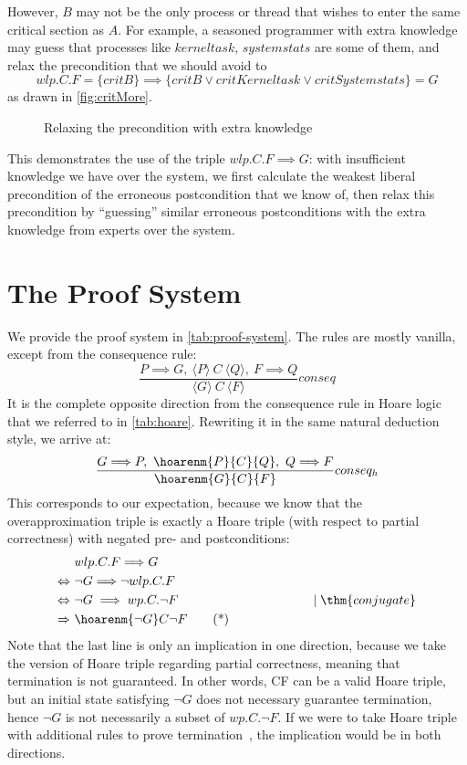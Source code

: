 However, $B$ may not be the only process or thread that wishes to enter the same critical section as $A$. 
For example, a seasoned programmer with extra knowledge may guess that processes like $kerneltask$, $systemstats$ are some of them, and relax the precondition that we should avoid to 
$$wlp.C.F = \{critB\}\implies \{critB \vee critKerneltask \vee critSystemstats\} = G$$
as drawn in \autoref{fig:critMore}. 
\begin{figure}[ht]
	\centering
	
	\caption{Relaxing the precondition with extra knowledge}
	\label{fig:critMore}
\end{figure}
This demonstrates the use of the triple $wlp.C.F{\implies} G$: with insufficient knowledge we have over the system, we first calculate the weakest liberal precondition of the erroneous postcondition that we know of, then relax this precondition by ``guessing'' similar erroneous postconditions with the extra knowledge from experts over the system. 

\section{The Proof System}
\newcommand{\nlp}[3]{\langle #1 \rangle\ #2\ \langle #3 \rangle}

We provide the proof system in \autoref{tab:proof-system}. 
The rules are mostly vanilla, except from the consequence rule: 
$$\displaystyle\frac{P{\implies} G,\ \nlp P C Q,\ F{\implies} Q}{\nlp{G}{C}{F}} conseq$$
It is the complete opposite direction from the consequence rule in Hoare logic that we referred to in \autoref{tab:hoare}. 
Rewriting it in the same natural deduction style, we arrive at: 
$$\displaystyle\frac{G{\implies} P,\ \hoarenm{P}{C}{Q},\ Q{\implies} F}{\hoarenm{G}{C}{F}}conseq_h$$
This corresponds to our expectation, because we know that the overapproximation triple is exactly a Hoare triple (with respect to partial correctness) with negated pre- and postconditions:
\begin{align*}
	& \ wlp.C.F{\implies} G \\
	\Leftrightarrow &\  \neg G {\implies} \neg wlp.C.F \\
	\Leftrightarrow &\  \neg G \implies wp.C.\neg F 
		\hspace{0.3\textwidth} \mid {\thm{conjugate}} \\
	\Rightarrow &\  \hoarenm{\neg G}C{\neg F} 
	\tag{*} 
\end{align*}
Note that the last line is only an implication in one direction, because we take the version of Hoare triple regarding partial correctness, meaning that termination is not guaranteed. 
In other words, C{\neg F} can be a valid Hoare triple, but an initial state satisfying $\neg G$ does not necessary guarantee termination, hence $\neg G$ is not necessarily a subset of $wp.C.\neg F$. 
If we were to take Hoare triple with additional rules to prove termination~\cite{manna74}, the implication would be in both directions. 

